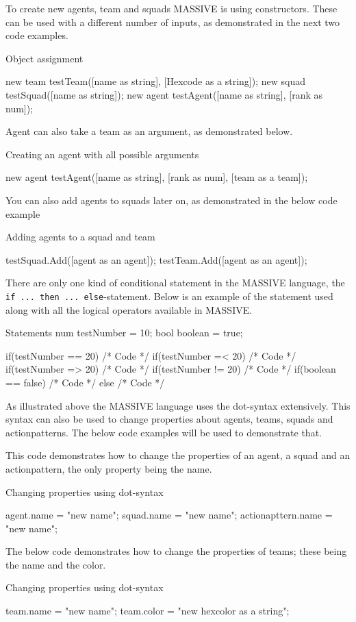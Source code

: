 To create new agents, team and squads MASSIVE is using constructors. These can be used with a different number of inputs, as demonstrated in the next two code examples.
\begin{source}{Object assignment}{}

new team testTeam([name as string], [Hexcode as a string]);
new squad testSquad([name as string]);
new agent testAgent([name as string], [rank as num]);

\end{source}

Agent can also take a team as an argument, as demonstrated below.
\begin{source}{Creating an agent with all possible arguments}{}

new agent testAgent([name as string], [rank as num], [team as a team]);

\end{source}

You can also add agents to squads later on, as demonstrated in the below code example
\begin{source}{Adding agents to a squad and team}{}

testSquad.Add([agent as an agent]);
testTeam.Add([agent as an agent]);

\end{source}

There are only one kind of conditional statement in the MASSIVE language, the \texttt{if ... then ... else}-statement. Below is an example of the statement used along with all the logical operators available in MASSIVE.

\begin{source}{Statements}{}
num testNumber = 10;
bool boolean = true;

if(testNumber == 20)
{
		/* Code */
}
if(testNumber =< 20)
{
		/* Code */
}
if(testNumber => 20)
{
		/* Code */
}
if(testNumber != 20)
{
		/* Code */
}
if(boolean == false)
{
		/* Code */
}
else
{
		/* Code */
}
\end{source}

As illustrated above the MASSIVE language uses the dot-syntax extensively. This syntax can also be used to change properties about agents, teams, squads and actionpatterns. The below code examples will be used to demonstrate that.

This code demonstrates how to change the properties of an agent, a squad and an actionpattern, the only property being the name.

\begin{source}{Changing properties using dot-syntax}{}

agent.name = "new name";
squad.name = "new name";
actionapttern.name = "new name";

\end{source}

The below code demonstrates how to change the properties of teams; these being the name and the color.

\begin{source}{Changing properties using dot-syntax}{}

team.name = "new name";
team.color = "new hexcolor as a string";

\end{source}

